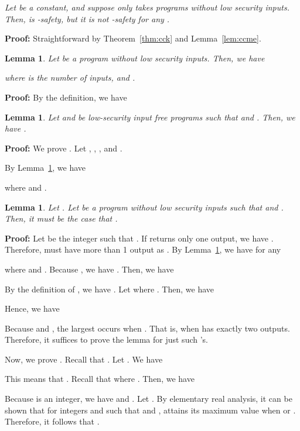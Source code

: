 \documentclass{llncs}
\newtheorem{lemma}[theorem]{Lemma}
\newenvironment{proof}{\noindent\rm{\bf Proof:}}{\hbox{}\vspace*{0.2\baselineskip}}
\newenvironment{reftheorem}[1]{\begin{trivlist}\item[\hskip
      \labelsep{\bf Theorem #1.}]\it}{\end{trivlist}}
\begin{document}
\begin{reftheorem}{\ref{thm:mek}}
  Let  be a constant, and suppose  only takes
  programs without low security inputs.  Then,  is
  -safety, but it is not -safety for any .
\end{reftheorem}
\begin{proof}
  Straightforward by Theorem~\ref{thm:cck} and Lemma~\ref{lem:ccme}.
\end{proof}

\begin{lemma}
  Let  be a program without low security inputs.  Then, we have
  
  where  is the number of inputs, and .
\label{lem:geu}
\end{lemma}
\begin{proof}
By the definition, we have

\end{proof}

\begin{lemma}
  Let  and  be low-security input free programs such that
   and
  .  Then, we have .
\label{lem:gemono2}
\end{lemma}
\begin{proof}
  We prove .  Let , , , and .

  By Lemma~\ref{lem:geu}, we have

where 
 and .
\end{proof}

\begin{lemma}
Let .  Let  be a program without low security
inputs such that  and .  Then, it must be the case that .
\label{lem:gemax}
\end{lemma}
\begin{proof}
  Let  be the integer such that .  If  returns
  only one output, we have .  Therefore,  must
  have more than 1 output as .  By
  Lemma~\ref{lem:geu}, we have for any 

where  and
.  Because
, we have .  Then, we have

By the definition of , we have .  Let 
where .  Then, we have

Hence, we have

Because 
and , the
largest  occurs when .  That is, when  has exactly two
outputs.  Therefore, it suffices to prove the lemma for just such
's.

Now, we prove .  Recall that
.  Let
.  We have

This means that .  Recall that
 where
.  Then, we have

Because  is an integer, we have  and .  Let
.  By elementary real analysis,
it can be shown that for integers  and  such that  and
,  attains its maximum value when  or
.  Therefore, it follows that
.
\end{proof}
\end{document}
